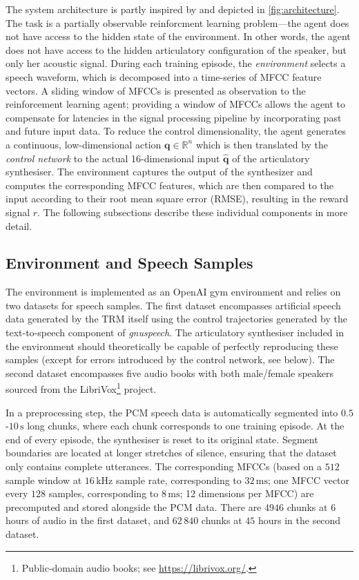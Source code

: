 \documentclass[letterpaper,10pt,conference]{ieeeconf}
\renewcommand{\vec}[1]{\bm{#1}}
\begin{document}
The system architecture is partly inspired by \cite{prom-on2013training,murakami2015seeing} and depicted in \cref{fig:architecture}. The task is a partially observable reinforcment learning problem---the agent does not have access to the hidden state of the environment. In other words, the agent does not have access to the hidden articulatory configuration of the speaker, but only her acoustic signal. During each training episode, the \emph{environment} selects a speech waveform, which is decomposed into a time-series of MFCC feature vectors. A sliding window of MFCCs is presented as observation to the reinforcement learning agent; providing a window of MFCCs allows the agent to compensate for latencies in the signal processing pipeline by incorporating past and future input data. To reduce the control dimensionality, the agent generates a continuous, low-dimensional action $\vec q \in \mathbb{R}^n$ which is then translated by the \emph{control network} to the actual 16-dimensional input $\vec{\hat q}$ of the articulatory synthesiser. The environment captures the output of the synthesizer and computes the corresponding MFCC features, which are then compared to the input according to their root mean square error (RMSE), resulting in the reward signal $r$. The following subsections describe these individual components in more detail.

\subsection{Environment and Speech Samples}

The environment is implemented as an OpenAI gym environment and relies on two datasets for speech samples. The first dataset encompasses artificial speech data generated by the TRM itself using the control trajectories generated by the text-to-speech component of \emph{gnuspeech}. The articulatory synthesiser included in the environment should theoretically be capable of perfectly reproducing these samples (except for errors introduced by the control network, see below). The second dataset encompasses five audio books with both male/female speakers sourced from the LibriVox\footnote{Public-domain audio books; see \url{https://librivox.org/}.} project.

In a preprocessing step, the PCM speech data is automatically segmented into $0.5$-$10\,\mathrm{s}$ long chunks, where each chunk corresponds to one training episode. At the end of every episode, the synthesiser is reset to its original state. Segment boundaries are located at longer stretches of silence, ensuring that the dataset only contains complete utterances. The corresponding MFCCs  (based on a $512$ sample window at $16\,\mathrm{kHz}$ sample rate, corresponding to $32\,\mathrm{ms}$; one MFCC vector every $128$ samples, corresponding to $8\,\mathrm{ms}$; 12 dimensions per MFCC) are precomputed and stored alongside the PCM data. There are $4946$ chunks at $6$ hours of audio in the first dataset, and $62\,840$ chunks at $45$ hours in the second dataset.
\end{document}
